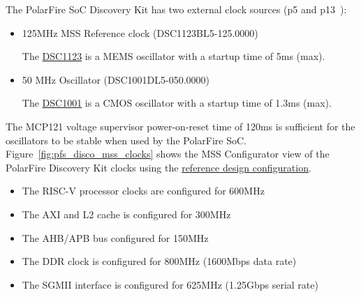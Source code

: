 The PolarFire SoC Discovery Kit has two external clock
sources (p5 and p13~\cite{Microchip_DISCO_UG_2025}):
%
\begin{itemize}
\item 125MHz MSS Reference clock (DSC1123BL5-125.0000)

The \href{https://www.microchip.com/en-us/product/DSC1123}{DSC1123} is a MEMS
oscillator with a startup time of 5ms (max).

\item 50 MHz Oscillator (DSC1001DL5-050.0000)

The \href{https://www.microchip.com/en-us/product/DSC1001}
{DSC1001} is a CMOS oscillator with a startup time of 1.3ms (max).

\end{itemize}
%
The MCP121 voltage supervisor power-on-reset time of 120ms
is sufficient for the oscillators to be stable when used by the PolarFire SoC.
%
Figure~\ref{fig:pfs_disco_mss_clocks} shows the MSS Configurator view of the
PolarFire Discovery Kit clocks using the
\href{https://github.com/polarfire-soc/polarfire-soc-discovery-kit-reference-design/blob/main/script_support/MPFS_DISCOVERY_KIT_MSS.cfg}
{reference design configuration}.
%
\begin{itemize}
\item The RISC-V processor clocks are configured for 600MHz
\item The AXI and L2 cache is configured for 300MHz
\item The AHB/APB bus configured for 150MHz
\item The DDR clock is configured for 800MHz (1600Mbps data rate)
\item The SGMII interface is configured for 625MHz (1.25Gbps serial rate)
\end{itemize}

